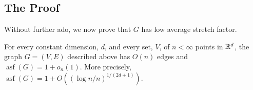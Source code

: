 \documentclass{patmorin}
\DeclareMathOperator{\asf}{asf}
\begin{document}
\subsection{The Proof}

Without further ado, we now prove that $G$ has low average stretch factor.

\begin{thm}
  For every constant dimension, $d$, and every set, $V$, of
  $n<\infty$ points in $\mathbb{R}^d$, the graph $G=(V,E)$ described above
  has $O(n)$ edges and $\asf(G)=1+o_n(1)$.  More precisely,
  $\asf(G)=1+O((\log n/n)^{1/(2d+1)})$.
\end{thm}
\end{document}
